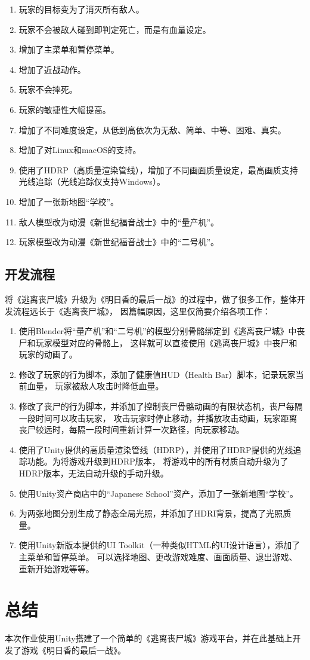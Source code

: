 \documentclass{article}
\begin{document}
\begin{enumerate}
    \item 玩家的目标变为了消灭所有敌人。
    \item 玩家不会被敌人碰到即判定死亡，而是有血量设定。
    \item 增加了主菜单和暂停菜单。
    \item 增加了近战动作。
    \item 玩家不会摔死。
    \item 玩家的敏捷性大幅提高。
    \item 增加了不同难度设定，从低到高依次为无敌、简单、中等、困难、真实。
    \item 增加了对Linux和macOS的支持。
    \item 使用了HDRP（高质量渲染管线），增加了不同画面质量设定，最高画质支持光线追踪（光线追踪仅支持Windows）。
    \item 增加了一张新地图``学校''。
    \item 敌人模型改为动漫《新世纪福音战士》中的``量产机''。
    \item 玩家模型改为动漫《新世纪福音战士》中的``二号机''。
\end{enumerate}

\subsection{开发流程}

将《逃离丧尸城》升级为《明日香的最后一战》的过程中，做了很多工作，整体开发流程远长于《逃离丧尸城》，
因篇幅原因，这里仅简要介绍各项工作：

\begin{enumerate}
    \item 使用Blender将``量产机''和``二号机''的模型分别骨骼绑定到《逃离丧尸城》中丧尸和玩家模型对应的骨骼上，
    这样就可以直接使用《逃离丧尸城》中丧尸和玩家的动画了。
    \item 修改了玩家的行为脚本，添加了健康值HUD（Health Bar）脚本，记录玩家当前血量，
    玩家被敌人攻击时降低血量。
    \item 修改了丧尸的行为脚本，并添加了控制丧尸骨骼动画的有限状态机，丧尸每隔一段时间可以攻击玩家，
    攻击玩家时停止移动，并播放攻击动画，玩家距离丧尸较远时，每隔一段时间重新计算一次路径，向玩家移动。
    \item 使用了Unity提供的高质量渲染管线（HDRP），并使用了HDRP提供的光线追踪功能。为将游戏升级到HDRP版本，
    将游戏中的所有材质自动升级为了HDRP版本，无法自动升级的手动升级。
    \item 使用Unity资产商店中的``Japanese School''资产，添加了一张新地图``学校''。
    \item 为两张地图分别生成了静态全局光照，并添加了HDRI背景，提高了光照质量。
    \item 使用Unity新版本提供的UI Toolkit（一种类似HTML的UI设计语言），添加了主菜单和暂停菜单。
    可以选择地图、更改游戏难度、画面质量、退出游戏、重新开始游戏等等。
\end{enumerate}

\section{总结}

本次作业使用Unity搭建了一个简单的《逃离丧尸城》游戏平台，并在此基础上开发了游戏《明日香的最后一战》。
\end{document}
